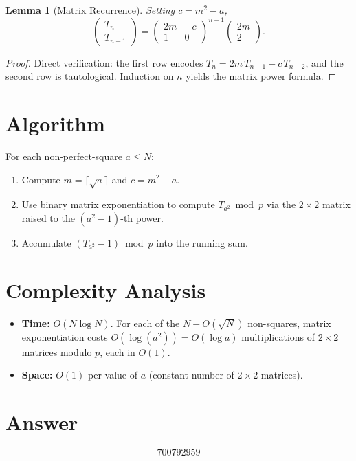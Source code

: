 \documentclass[11pt]{article}
\newtheorem{lemma}[theorem]{Lemma}
\begin{document}
\begin{lemma}[Matrix Recurrence]
Setting $c = m^2 - a$,
\[
\begin{pmatrix} T_n \\ T_{n-1} \end{pmatrix}
= \begin{pmatrix} 2m & -c \\ 1 & 0 \end{pmatrix}^{n-1}
\begin{pmatrix} 2m \\ 2 \end{pmatrix}.
\]
\end{lemma}

\begin{proof}
Direct verification: the first row encodes $T_n = 2m\,T_{n-1} - c\,T_{n-2}$, and the second row is tautological. Induction on $n$ yields the matrix power formula.
\end{proof}

\section{Algorithm}

For each non-perfect-square $a \le N$:
\begin{enumerate}
\item Compute $m = \lceil\sqrt{a}\rceil$ and $c = m^2 - a$.
\item Use binary matrix exponentiation to compute $T_{a^2} \bmod p$ via the $2 \times 2$ matrix raised to the $(a^2-1)$-th power.
\item Accumulate $(T_{a^2} - 1) \bmod p$ into the running sum.
\end{enumerate}

\section{Complexity Analysis}

\begin{itemize}
\item \textbf{Time:} $O(N \log N)$. For each of the $N - O(\sqrt{N})$ non-squares, matrix exponentiation costs $O(\log(a^2)) = O(\log a)$ multiplications of $2\times 2$ matrices modulo $p$, each in $O(1)$.
\item \textbf{Space:} $O(1)$ per value of $a$ (constant number of $2\times 2$ matrices).
\end{itemize}

\section{Answer}

\[
\boxed{700792959}
\]
\end{document}

